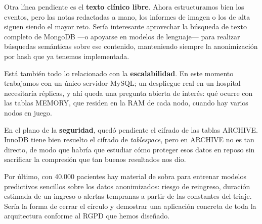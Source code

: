 \documentclass[../main.tex]{subfiles}
\begin{document}
Otra línea pendiente es el \textbf{texto clínico libre}. Ahora estructuramos bien los eventos, pero las notas redactadas a mano, los informes de imagen o los de alta siguen siendo el mayor reto. Sería interesante aprovechar la búsqueda de texto completo de MongoDB ---o apoyarse en modelos de lenguaje--- para realizar búsquedas semánticas sobre ese contenido, manteniendo siempre la anonimización por hash que ya tenemos implementada.

Está también todo lo relacionado con la \textbf{escalabilidad}. En este momento trabajamos con un único servidor MySQL; un despliegue real en un hospital necesitaría réplicas, y ahí queda una pregunta abierta de interés: qué ocurre con las tablas MEMORY, que residen en la RAM de cada nodo, cuando hay varios nodos en juego.

En el plano de la \textbf{seguridad}, quedó pendiente el cifrado de las tablas ARCHIVE. InnoDB tiene bien resuelto el cifrado de \textit{tablespace}, pero en ARCHIVE no es tan directo, de modo que habría que estudiar cómo proteger esos datos en reposo sin sacrificar la compresión que tan buenos resultados nos dio.

Por último, con 40.000 pacientes hay material de sobra para entrenar modelos predictivos sencillos sobre los datos anonimizados: riesgo de reingreso, duración estimada de un ingreso o alertas tempranas a partir de las constantes del triaje. Sería la forma de cerrar el círculo y demostrar una aplicación concreta de toda la arquitectura conforme al RGPD que hemos diseñado.
\end{document}
